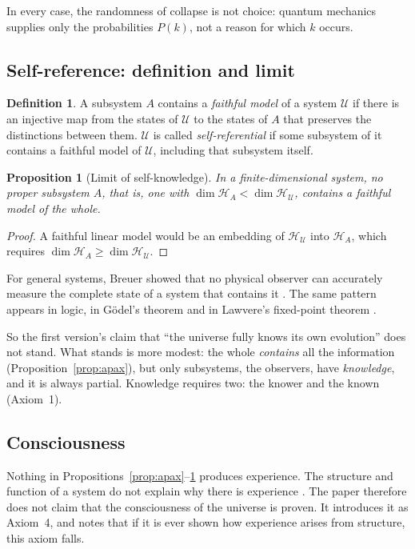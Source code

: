 \documentclass[a4paper,11pt]{article}
\newtheorem{prop}{Proposition}
\theoremstyle{definition}
\newtheorem{defn}{Definition}
\begin{document}
In every case, the randomness of collapse is not choice: quantum mechanics supplies only the probabilities $P(k)$, not a reason for which $k$ occurs.

\subsection{Self-reference: definition and limit}\label{sec:self}

\begin{defn}
A subsystem $A$ contains a \emph{faithful model} of a system $\mathcal U$ if there is an injective map from the states of $\mathcal U$ to the states of $A$ that preserves the distinctions between them. $\mathcal U$ is called \emph{self-referential} if some subsystem of it contains a faithful model of $\mathcal U$, including that subsystem itself.
\end{defn}

\begin{prop}[Limit of self-knowledge]\label{prop:self}
In a finite-dimensional system, no proper subsystem $A$, that is, one with $\dim\mathcal H_A<\dim\mathcal H_{\mathcal U}$, contains a faithful model of the whole.
\end{prop}
\begin{proof}
A faithful linear model would be an embedding of $\mathcal H_{\mathcal U}$ into $\mathcal H_A$, which requires $\dim\mathcal H_A\ge\dim\mathcal H_{\mathcal U}$.
\end{proof}

For general systems, Breuer showed that no physical observer can accurately measure the complete state of a system that contains it \cite{breuer}. The same pattern appears in logic, in Gödel's theorem \cite{godel} and in Lawvere's fixed-point theorem \cite{lawvere}.

So the first version's claim that ``the universe fully knows its own evolution'' does not stand. What stands is more modest: the whole \emph{contains} all the information (Proposition~\ref{prop:apax}), but only subsystems, the observers, have \emph{knowledge}, and it is always partial. Knowledge requires two: the knower and the known (Axiom~1).

\subsection{Consciousness}\label{sec:cons}

Nothing in Propositions~\ref{prop:apax}--\ref{prop:self} produces experience. The structure and function of a system do not explain why there is experience \cite{chalmers}. The paper therefore does not claim that the consciousness of the universe is proven. It introduces it as Axiom~4, and notes that if it is ever shown how experience arises from structure, this axiom falls.
\end{document}

